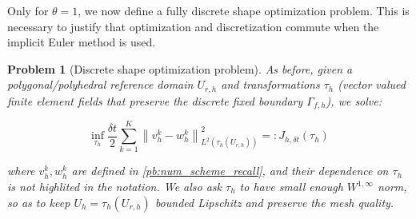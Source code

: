 \documentclass[english,a4paper,10pt,oneside]{scrbook}	%
\theoremstyle{break}
\newtheorem{pb}[equation]{Problem}
\theoremstyle{remark}
\newcommand{\norm}[1]{\left\lVert#1\right\rVert}
\newcommand{\te}{\theta}
\begin{document}
%


Only for $\te = 1$, we now define a fully discrete shape optimization problem. This is necessary to justify that optimization and discretization commute when the implicit Euler method is used.



\begin{pb}[Discrete shape optimization problem]
\label{pb:discr_shopt}
As before, given a polygonal/polyhedral reference domain $U_{r,h}$ and transformations $\tau_h$ (vector valued finite element fields that preserve the discrete fixed boundary $\Gamma_{f,h}$), we solve:

$$\inf_{\tau_h }\frac{\delta t}{2}\sum_{k=1}^{K}\norm{v_h^k-w^k_h}_{L^2(\tau_h(U_{r,h}))}^2=:J_{h,\delta t}(\tau_h)$$


where $v_h^k, w^k_h$ are defined in \cref{pb:num_scheme_recall}, and their dependence on $\tau_h$ is not highlited in the notation. We also ask $\tau_h$ to have small enough $W^{1,\infty}$ norm, so as to keep $U_h = \tau_h(U_{r,h})$ bounded Lipschitz and preserve the mesh quality.

\end{pb}
\end{document}
